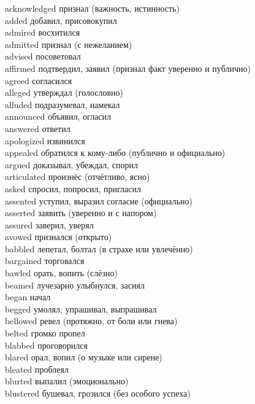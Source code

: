 \documentclass[a4paper,12pt,fleqn]{book}\usepackage{polyglossia}\setdefaultlanguage[babelshorthands=true]{russian}\setotherlanguage{english}\defaultfontfeatures{Ligatures=TeX,Mapping=tex-text}\usepackage{xcolor}\newcommand{\ml}[3]{#2}
\begin{document}
{acknowledged \hfill признал (важность, истинность)\\
added \hfill добавил, присовокупил\\
admired \hfill восхитился\\
admitted \hfill признал (с нежеланием)\\
advised \hfill посоветовал\\
affirmed \hfill подтвердил, заявил (признал факт уверенно и публично)\\
agreed \hfill согласился\\
alleged \hfill утверждал (голословно)\\
alluded \hfill подразумевал, намекал\\
announced \hfill объявил, огласил\\
answered \hfill ответил\\
apologized \hfill извинился\\
appealed \hfill обратился к кому-либо (публично и официально)\\
argued \hfill доказывал, убеждал, спорил\\
articulated \hfill произнёс (отчётливо, ясно)\\
asked \hfill спросил, попросил, пригласил\\
assented \hfill уступил, выразил согласие (официально)\\
asserted \hfill заявить (уверенно и с напором)\\
assured \hfill заверил, уверял\\
avowed \hfill признался (открыто)\\
babbled \hfill лепетал, болтал (в страхе или увлечённо)\\
bargained \hfill торговался\\
bawled \hfill орать, вопить (слёзно)\\
beamed \hfill лучезарно улыбнулся, засиял\\
began \hfill начал\\
begged \hfill умолял, упрашивал, выпрашивал\\
bellowed \hfill ревел (протяжно, от боли или гнева)\\
belted \hfill громко пропел\\
blabbed \hfill проговорился\\
blared \hfill орал, вопил (о музыке или сирене)\\
bleated \hfill проблеял\\
blurted \hfill выпалил (эмоционально)\\
blustered \hfill бушевал, грозился (без особого успеха)\\
}
\end{document}
